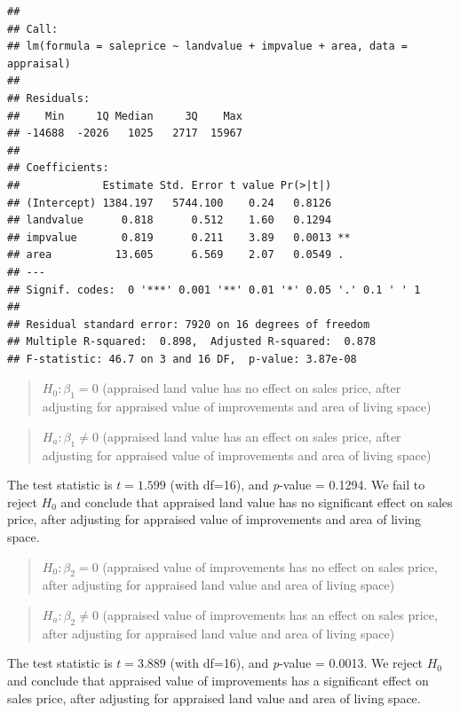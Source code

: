 \documentclass[
]{book}
\begin{document}
\begin{verbatim}
## 
## Call:
## lm(formula = saleprice ~ landvalue + impvalue + area, data = appraisal)
## 
## Residuals:
##    Min     1Q Median     3Q    Max 
## -14688  -2026   1025   2717  15967 
## 
## Coefficients:
##             Estimate Std. Error t value Pr(>|t|)   
## (Intercept) 1384.197   5744.100    0.24   0.8126   
## landvalue      0.818      0.512    1.60   0.1294   
## impvalue       0.819      0.211    3.89   0.0013 **
## area          13.605      6.569    2.07   0.0549 . 
## ---
## Signif. codes:  0 '***' 0.001 '**' 0.01 '*' 0.05 '.' 0.1 ' ' 1
## 
## Residual standard error: 7920 on 16 degrees of freedom
## Multiple R-squared:  0.898,  Adjusted R-squared:  0.878 
## F-statistic: 46.7 on 3 and 16 DF,  p-value: 3.87e-08
\end{verbatim}

\begin{quote}
\(H_0: \beta_1 = 0\) (appraised land value has no effect on sales price, after adjusting for appraised value of improvements and area of living space)
\end{quote}

\begin{quote}
\(H_a: \beta_1 \neq 0\) (appraised land value has an effect on sales price, after adjusting for appraised value of improvements and area of living space)
\end{quote}

The test statistic is \(t = 1.599\) (with df=16), and \emph{p}-value = 0.1294. We fail to reject \(H_0\) and conclude that appraised land value has no significant effect on sales price, after adjusting for appraised value of improvements and area of living space.

\begin{quote}
\(H_0: \beta_2 = 0\) (appraised value of improvements has no effect on sales price, after adjusting for appraised land value and area of living space)
\end{quote}

\begin{quote}
\(H_a: \beta_2 \neq 0\) (appraised value of improvements has an effect on sales price, after adjusting for appraised land value and area of living space)
\end{quote}

The test statistic is \(t = 3.889\) (with df=16), and \emph{p}-value = 0.0013. We reject \(H_0\) and conclude that appraised value of improvements has a significant effect on sales price, after adjusting for appraised land value and area of living space.
\end{document}
